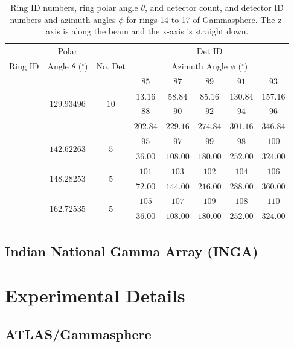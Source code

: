\begin{table}
\label{tbl:chp3-gs-angles3}
\caption{Ring ID numbers, ring polar angle $\theta$, and detector count, and detector ID numbers and azimuth angles $\phi$ for rings 14 to 17 of Gammasphere. The z-axis is along the beam and the x-axis is straight down.}
\begin{tabular}{|c|c|c|c|c|c|c|c|}
\hline
\hline&Polar&&\multicolumn{5}{|c|}{Det ID}\\ 
Ring ID & Angle $\theta$ ($^{\circ}$) & No. Det&\multicolumn{5}{|c|}{Azimuth Angle $\phi$ ($^{\circ}$)}\\ 
\hline{}\multirow{4}{*}{$14$}&\multirow{4}{*}{$129.93496$}&\multirow{4}{*}{$10$}&$85$&$87$&$89$&$91$&$93$\\
&&&$13.16$&$58.84$&$85.16$&$130.84$&$157.16$\\
\cline{4-8}&&&$88$&$90$&$92$&$94$&$96$\\
&&&$202.84$&$229.16$&$274.84$&$301.16$&$346.84$\\   
\hline{}\multirow{2}{*}{$15$}&\multirow{2}{*}{$142.62263$}&\multirow{2}{*}{$5$}&$95$&$97$&$99$&$98$&$100$\\
&&&$36.00$&$108.00$&$180.00$&$252.00$&$324.00$\\ 
\hline{}\multirow{2}{*}{$16$}&\multirow{2}{*}{$148.28253$}&\multirow{2}{*}{$5$}&$101$&$103$&$102$&$104$&$106$\\
&&&$72.00$&$144.00$&$216.00$&$288.00$&$360.00$\\ 
\hline{}\multirow{2}{*}{$17$}&\multirow{2}{*}{$162.72535$}&\multirow{2}{*}{$5$}&$105$&$107$&$109$&$108$&$110$\\
&&&$36.00$&$108.00$&$180.00$&$252.00$&$324.00$\\
\hline
\end{tabular} 
\end{table}

\subsection{Indian National Gamma Array (INGA)}
\label{ssec:exp-pr-gamma-spec-inga}

\section{Experimental Details}
\label{sec:exp-pr-details}
\subsection{ATLAS/Gammasphere}
\label{ssec:exp-pr-details-gs}
